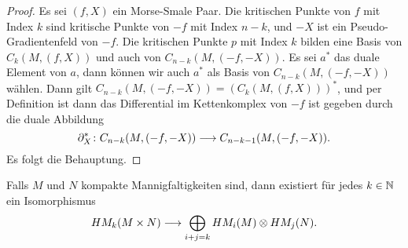 \begin{proof}
    Es sei $(f, X)$ ein Morse-Smale Paar. Die kritischen Punkte von $f$ mit Index $k$ sind kritische Punkte
    von $-f$ mit Index $n - k$, und $-X$ ist ein Pseudo-Gradientenfeld von $-f$. Die kritischen Punkte 
    $p$ mit Index $k$ bilden eine Basis von $C_k (M, (f, X))$ und auch von $C_{n - k}(M, (-f, -X))$.
    Es sei $a^{\ast}$ das duale Element von $a$, dann können wir auch $a^{\ast}$ als Basis von 
    $C_{n - k}(M, (-f, -X))$ wählen. Dann gilt $C_{n - k} (M, (-f, -X)) = (C_k (M, (f, X)))^{\ast}$,
    und per Definition ist dann das Differential im Kettenkomplex von $-f$ ist gegeben durch die duale Abbildung
    \[ { \partial }_X^{\ast} \colon C_{n - k} (M, (-f, -X)) \longrightarrow C_{n - k - 1} (M, (-f, -X)) . \]
    Es folgt die Behauptung.
\end{proof}

\begin{theorem}
    Falls $M$ und $N$ kompakte Mannigfaltigkeiten sind, dann existiert für jedes $k \in { \mathbb N }$ ein Isomorphismus
    \[ HM_k (M \times N) \longrightarrow \bigoplus_{i + j = k} HM_i (M) \otimes HM_j (N) . \]
\end{theorem}
